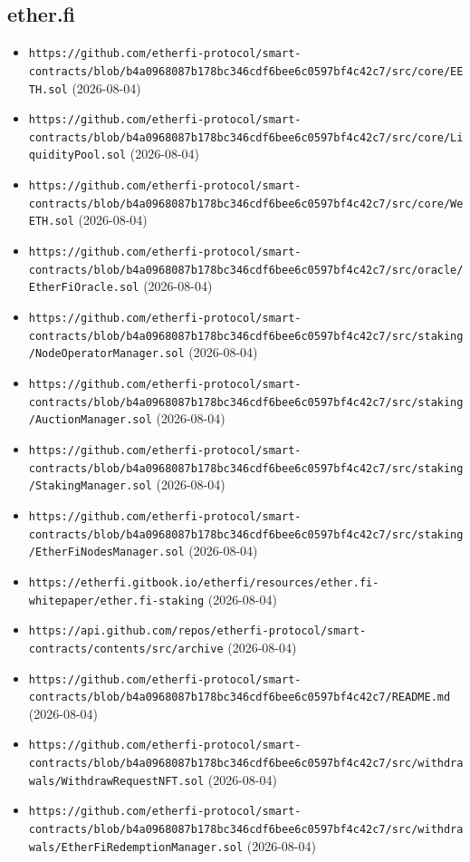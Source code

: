 \subsection*{ether.fi}
\begin{itemize}\setlength{\itemsep}{0pt}\small
\item \texttt{https://github.com/etherfi-protocol/smart-contracts/blob/b4a0968087b178bc346cdf6bee6c0597bf4c42c7/src/core/EETH.sol} (2026-08-04)
\item \texttt{https://github.com/etherfi-protocol/smart-contracts/blob/b4a0968087b178bc346cdf6bee6c0597bf4c42c7/src/core/LiquidityPool.sol} (2026-08-04)
\item \texttt{https://github.com/etherfi-protocol/smart-contracts/blob/b4a0968087b178bc346cdf6bee6c0597bf4c42c7/src/core/WeETH.sol} (2026-08-04)
\item \texttt{https://github.com/etherfi-protocol/smart-contracts/blob/b4a0968087b178bc346cdf6bee6c0597bf4c42c7/src/oracle/EtherFiOracle.sol} (2026-08-04)
\item \texttt{https://github.com/etherfi-protocol/smart-contracts/blob/b4a0968087b178bc346cdf6bee6c0597bf4c42c7/src/staking/NodeOperatorManager.sol} (2026-08-04)
\item \texttt{https://github.com/etherfi-protocol/smart-contracts/blob/b4a0968087b178bc346cdf6bee6c0597bf4c42c7/src/staking/AuctionManager.sol} (2026-08-04)
\item \texttt{https://github.com/etherfi-protocol/smart-contracts/blob/b4a0968087b178bc346cdf6bee6c0597bf4c42c7/src/staking/StakingManager.sol} (2026-08-04)
\item \texttt{https://github.com/etherfi-protocol/smart-contracts/blob/b4a0968087b178bc346cdf6bee6c0597bf4c42c7/src/staking/EtherFiNodesManager.sol} (2026-08-04)
\item \texttt{https://etherfi.gitbook.io/etherfi/resources/ether.fi-whitepaper/ether.fi-staking} (2026-08-04)
\item \texttt{https://api.github.com/repos/etherfi-protocol/smart-contracts/contents/src/archive} (2026-08-04)
\item \texttt{https://github.com/etherfi-protocol/smart-contracts/blob/b4a0968087b178bc346cdf6bee6c0597bf4c42c7/README.md} (2026-08-04)
\item \texttt{https://github.com/etherfi-protocol/smart-contracts/blob/b4a0968087b178bc346cdf6bee6c0597bf4c42c7/src/withdrawals/WithdrawRequestNFT.sol} (2026-08-04)
\item \texttt{https://github.com/etherfi-protocol/smart-contracts/blob/b4a0968087b178bc346cdf6bee6c0597bf4c42c7/src/withdrawals/EtherFiRedemptionManager.sol} (2026-08-04)

\end{itemize}
